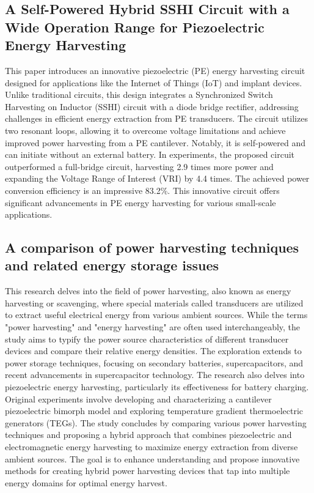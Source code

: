 \documentclass[11pt]{report}	%
\begin{document}
\subsection{A Self-Powered Hybrid SSHI Circuit with a Wide Operation Range for Piezoelectric Energy Harvesting}
This paper introduces an innovative piezoelectric (PE) energy harvesting circuit designed for applications like the Internet of Things (IoT) and implant devices. Unlike traditional circuits, this design integrates a Synchronized Switch Harvesting on Inductor (SSHI) circuit with a diode bridge rectifier, addressing challenges in efficient energy extraction from PE transducers. The circuit utilizes two resonant loops, allowing it to overcome voltage limitations and achieve improved power harvesting from a PE cantilever. Notably, it is self-powered and can initiate without an external battery. In experiments, the proposed circuit outperformed a full-bridge circuit, harvesting 2.9 times more power and expanding the Voltage Range of Interest (VRI) by 4.4 times. The achieved power conversion efficiency is an impressive 83.2\%. This innovative circuit offers significant advancements in PE energy harvesting for various small-scale applications.

\subsection{A comparison of power harvesting techniques and related energy storage issues}
This research delves into the field of power harvesting, also known as energy harvesting or scavenging, where special materials called transducers are utilized to extract useful electrical energy from various ambient sources. While the terms "power harvesting" and "energy harvesting" are often used interchangeably, the study aims to typify the power source characteristics of different transducer devices and compare their relative energy densities. The exploration extends to power storage techniques, focusing on secondary batteries, supercapacitors, and recent advancements in supercapacitor technology. The research also delves into piezoelectric energy harvesting, particularly its effectiveness for battery charging. Original experiments involve developing and characterizing a cantilever piezoelectric bimorph model and exploring temperature gradient thermoelectric generators (TEGs). The study concludes by comparing various power harvesting techniques and proposing a hybrid approach that combines piezoelectric and electromagnetic energy harvesting to maximize energy extraction from diverse ambient sources. The goal is to enhance understanding and propose innovative methods for creating hybrid power harvesting devices that tap into multiple energy domains for optimal energy harvest.
\end{document}
